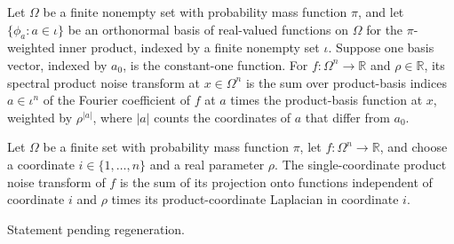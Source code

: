 \begin{definition}
\label{FABL.spectralProductNoiseOperator}
\leanok
{}
Let $\Omega$ be a finite nonempty set with probability mass function $\pi$, and let
$\{\phi_a:a\in\iota\}$ be an orthonormal basis of real-valued functions on $\Omega$ for
the $\pi$-weighted inner product, indexed by a finite nonempty set $\iota$. Suppose one
basis vector, indexed by $a_0$, is the constant-one function. For
$f\colon\Omega^n\to\mathbb{R}$ and $\rho\in\mathbb{R}$, its spectral product noise
transform at $x\in\Omega^n$ is the sum over product-basis indices $a\in\iota^n$ of the
Fourier coefficient of $f$ at $a$ times the product-basis function at $x$, weighted by
$\rho^{|a|}$, where $|a|$ counts the coordinates of $a$ that differ from $a_0$.
\end{definition}

\begin{definition}
\label{FABL.productSingleCoordinateNoiseOperator}
\leanok
{}
Let $\Omega$ be a finite set with probability mass function $\pi$, let
$f\colon\Omega^n\to\mathbb{R}$, and choose a coordinate $i\in\{1,\ldots,n\}$ and a real
parameter $\rho$. The single-coordinate product noise transform of $f$ is the sum of its
projection onto functions independent of coordinate $i$ and $\rho$ times its
product-coordinate Laplacian in coordinate $i$.
\end{definition}

\begin{theorem}
\label{FABL.productSingleCoordinateNoiseOperator_eq}
\leanok
{}
Statement pending regeneration.
\end{theorem}

